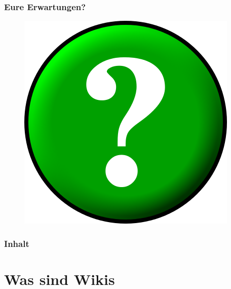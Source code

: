 \documentclass{beamer}              %
\begin{document}
\begin{frame}
  \frametitle{Eure Erwartungen?}

  \begin{figure}
      \includegraphics[scale=0.5]{Circle-question_400x400.png}
      \label{fig:Fragezeichenschild}
  \end{figure}
  
\end{frame}


\begin{frame}
  \frametitle{Inhalt}
  \tableofcontents
\end{frame}

\AtBeginSection{%
  \tableofcontents[currentsection]
}

\section{Was sind Wikis}
\end{document}
